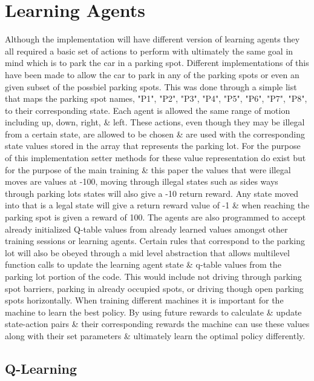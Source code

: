 \documentclass[letterpaper]{article}
\begin{document}
\section{Learning Agents}
Although the implementation will have different version of learning agents they all required a basic set of actions to perform with ultimately the same goal in mind which is to park the car in a parking spot.  Different implementations of this have been made to allow the car to park in any of the parking spots or even an given subset of the possbiel parking spots.  This was done through a simple list that maps the parking spot names, "P1", "P2", "P3", "P4", "P5", "P6", "P7", "P8", to their corresponding state.  Each agent is allowed the same range of motion including up, down, right, \& left.  These actions, even though they may be illegal from a certain state, are allowed to be chosen \& are used with the corresponding state values stored in the array that represents the parking lot.  For the purpose of this implementation setter methods for these value representation do exist but for the purpose of the main training \& this paper the values that were illegal moves are values at -100, moving through illegal states such as sides ways through parking lots states will also give a -10 return reward. Any state moved into that is a legal state will give a return reward value of -1 \& when reaching the parking spot is given a reward of 100.  The agents are also programmed to accept already initialized Q-table values from already learned values amongst other training sessions or learning agents.  Certain rules that correspond to the parking lot will also be obeyed through a mid level abstraction that allows multilevel function calls to update the learning agent state \& q-table values from the parking lot portion of the code.  This would include not driving through parking spot barriers, parking in already occupied spots, or driving though open parking spots horizontally.  When training different machines it is important for the machine to learn the best policy.  By using future rewards to calculate \& update state-action pairs \& their corresponding rewards the machine can use these values along with their set parameters \& ultimately learn the optimal policy differently.   

\subsection{Q-Learning}
\end{document}
